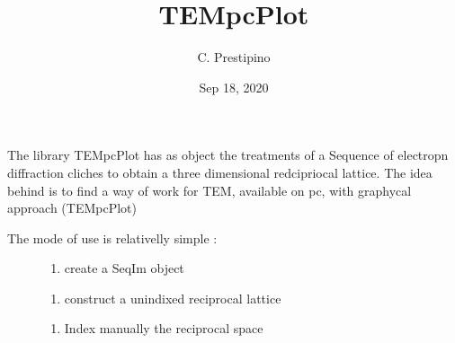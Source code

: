 \documentclass[letterpaper,10pt,english]{sphinxmanual}
\title{TEMpcPlot}
\date{Sep 18, 2020}
\author{C.\@{} Prestipino}
\begin{document}
\pagestyle{empty}
\sphinxmaketitle
\pagestyle{plain}
\sphinxtableofcontents
\pagestyle{normal}
\label{\detokenize{index::doc}}

The library TEMpcPlot has as object the treatments of a Sequence of
electropn diffraction cliches to obtain a three dimensional redcipriocal
lattice. The idea behind is to find a way of work for TEM, available on pc,
with graphycal approach (TEMpcPlot)
\begin{description}
\item[{The mode of use is relativelly simple :}] \leavevmode\begin{enumerate}
%
\item {} 
create a SeqIm object

\end{enumerate}

\begin{sphinxVerbatim}[commandchars=\\\{\}]
   
\end{sphinxVerbatim}
\begin{enumerate}
%
\setcounter{enumi}{1}
\item {} 
construct a unindixed reciprocal lattice

\end{enumerate}

\begin{sphinxVerbatim}[commandchars=\\\{\}]
\end{sphinxVerbatim}
\begin{enumerate}
%
\setcounter{enumi}{2}
\item {} 
Index manually the reciprocal space

\end{enumerate}


\end{description}
\end{document}
